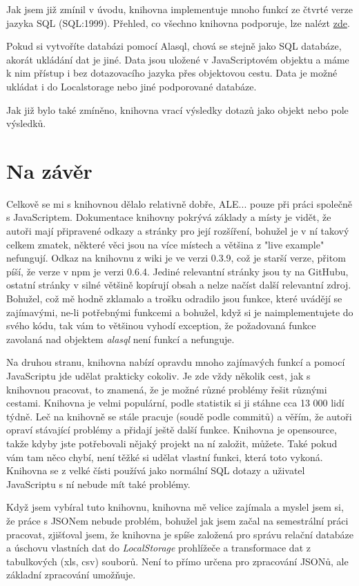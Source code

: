 \documentclass[a4, titlepage]{article}
\begin{document}
Jak jsem již zmínil v úvodu, knihovna implementuje mnoho funkcí ze čtvrté verze jazyka SQL (SQL:1999). Přehled, co všechno knihovna podporuje, lze nalézt \href{https://github.com/agershun/alasql}{zde}.  

Pokud si vytvoříte databázi pomocí Alasql, chová se stejně jako SQL databáze, akorát ukládání dat je jiné. Data jsou uložené v JavaScriptovém objektu a máme k nim přístup i bez dotazovacího jazyka přes objektovou cestu. Data je možné ukládat i do Localstorage nebo jiné podporované databáze.

Jak již bylo také zmíněno, knihovna vrací výsledky dotazů jako objekt nebo pole výsledků.

\section{Na závěr}
Celkově se mi s knihovnou dělalo relativně dobře, ALE... pouze při práci společně s JavaScriptem. Dokumentace knihovny pokrývá základy a místy je vidět, že autoři mají připravené odkazy a stránky pro její rozšíření, bohužel je v ní takový celkem zmatek, některé věci jsou na více místech a většina z "live example" nefungují. Odkaz na knihovnu z wiki je ve verzi 0.3.9, což je starší verze, přitom píší, že verze v npm je verzi 0.6.4. Jediné relevantní stránky jsou ty na GitHubu, ostatní stránky v silné většině kopírují obsah a nelze načíst další relevantní zdroj. Bohužel, což mě hodně zklamalo a trošku odradilo jsou funkce, které uvádějí se zajímavými, ne-li potřebnými funkcemi a bohužel, když si je naimplementujete do svého kódu, tak vám to většinou vyhodí exception, že požadovaná funkce zavolaná nad objektem \textit{alasql} není funkcí a nefunguje. 

Na druhou stranu, knihovna nabízí opravdu mnoho zajímavých funkcí a pomocí JavaScriptu jde udělat prakticky cokoliv. Je zde vždy několik cest, jak s knihovnou pracovat, to znamená, že je možné různé problémy řešit různými cestami. Knihovna je velmi populární, podle statistik si ji stáhne cca 13 000 lidí týdně. Leč na knihovně se stále pracuje (soudě podle commitů) a věřím, že autoři opraví stávající problémy a přidají ještě další funkce. Knihovna je opensource, takže kdyby jste potřebovali nějaký projekt na ní založit, můžete. Také pokud vám tam něco chybí, není těžké si udělat vlastní funkci, která toto vykoná. Knihovna se z velké čísti používá jako normální SQL dotazy a uživatel JavaScriptu s ní nebude mít také problémy.

Když jsem vybíral tuto knihovnu, knihovna mě velice zajímala a myslel jsem si, že práce s JSONem nebude problém, bohužel jak jsem začal na semestrální práci pracovat, zjišťoval jsem, že knihovna je spíše založená pro správu relační databáze a úschovu vlastních dat do \textit{LocalStorage} prohlížeče a transformace dat z tabulkových (xls, csv) souborů. Není to přímo určena pro zpracování JSONů, ale základní zpracování umožňuje.
\end{document}
